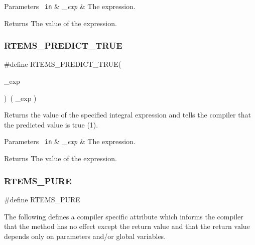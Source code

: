 \begin{DoxyParams}[1]{Parameters}
\mbox{\texttt{ in}}  & {\em \+\_\+exp} & The expression.\\
\hline
\end{DoxyParams}
\begin{DoxyReturn}{Returns}
The value of the expression. 
\end{DoxyReturn}
\mbox{\label{group__RTEMSScoreBaseDefs_gaa1996ef46facf329baf06d7f3276829f}} 
\subsubsection{\texorpdfstring{RTEMS\_PREDICT\_TRUE}{RTEMS\_PREDICT\_TRUE}}
{\footnotesize\ttfamily \#define R\+T\+E\+M\+S\+\_\+\+P\+R\+E\+D\+I\+C\+T\+\_\+\+T\+R\+UE(\begin{DoxyParamCaption}\item[{}]{\+\_\+exp }\end{DoxyParamCaption})~( \+\_\+exp )}



Returns the value of the specified integral expression and tells the compiler that the predicted value is true (1). 


\begin{DoxyParams}[1]{Parameters}
\mbox{\texttt{ in}}  & {\em \+\_\+exp} & The expression.\\
\hline
\end{DoxyParams}
\begin{DoxyReturn}{Returns}
The value of the expression. 
\end{DoxyReturn}
\mbox{\label{group__RTEMSScoreBaseDefs_gaec99cd3de9d6cdbc517b1af5bf64556b}} 
\subsubsection{\texorpdfstring{RTEMS\_PURE}{RTEMS\_PURE}}
{\footnotesize\ttfamily \#define R\+T\+E\+M\+S\+\_\+\+P\+U\+RE}

The following defines a compiler specific attribute which informs the compiler that the method has no effect except the return value and that the return value depends only on parameters and/or global variables. \mbox{\label{group__RTEMSScoreBaseDefs_ga70a1b8869a1ec49d30613af22ebc3f50}} 
